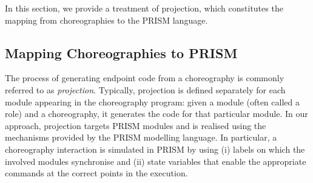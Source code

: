 In this section, we provide a treatment of projection, which
constitutes the mapping from choreographies to the PRISM language.
%

\subsection{Mapping Choreographies to PRISM} 
%
The process of generating endpoint code from a choreography is
commonly referred to as \emph{projection}. Typically, projection is
defined separately for each module appearing in the choreography
program: given a module (often called a role) and a choreography, it
generates the code for that particular module.
% 
In our approach, projection targets PRISM modules and is realised
using the mechanisms provided by the PRISM modelling language. In
particular, a choreography interaction is simulated in PRISM by using
(i) labels on which the involved modules synchronise and (ii) state
variables that enable the appropriate commands at the correct points
in the execution.
%

